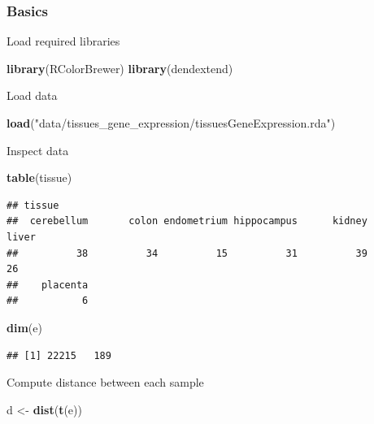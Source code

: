\documentclass[]{book}
\newenvironment{Shaded}{\begin{snugshade}}{\end{snugshade}}
\newcommand{\KeywordTok}[1]{\textcolor[rgb]{0.13,0.29,0.53}{\textbf{{#1}}}}
\newcommand{\StringTok}[1]{\textcolor[rgb]{0.31,0.60,0.02}{{#1}}}
\newcommand{\NormalTok}[1]{{#1}}
\theoremstyle{definition}
\theoremstyle{definition}
\theoremstyle{definition}
\theoremstyle{remark}
\begin{document}
\subsubsection{Basics}\label{basics}

Load required libraries

\begin{Shaded}
\begin{Highlighting}[]
\KeywordTok{library}\NormalTok{(RColorBrewer)}
\KeywordTok{library}\NormalTok{(dendextend)}
\end{Highlighting}
\end{Shaded}

Load data

\begin{Shaded}
\begin{Highlighting}[]
\KeywordTok{load}\NormalTok{(}\StringTok{"data/tissues_gene_expression/tissuesGeneExpression.rda"}\NormalTok{)}
\end{Highlighting}
\end{Shaded}

Inspect data

\begin{Shaded}
\begin{Highlighting}[]
\KeywordTok{table}\NormalTok{(tissue)}
\end{Highlighting}
\end{Shaded}

\begin{verbatim}
## tissue
##  cerebellum       colon endometrium hippocampus      kidney       liver 
##          38          34          15          31          39          26 
##    placenta 
##           6
\end{verbatim}

\begin{Shaded}
\begin{Highlighting}[]
\KeywordTok{dim}\NormalTok{(e)}
\end{Highlighting}
\end{Shaded}

\begin{verbatim}
## [1] 22215   189
\end{verbatim}

Compute distance between each sample

\begin{Shaded}
\begin{Highlighting}[]
\NormalTok{d <-}\StringTok{ }\KeywordTok{dist}\NormalTok{(}\KeywordTok{t}\NormalTok{(e))}
\end{Highlighting}
\end{Shaded}
\end{document}
